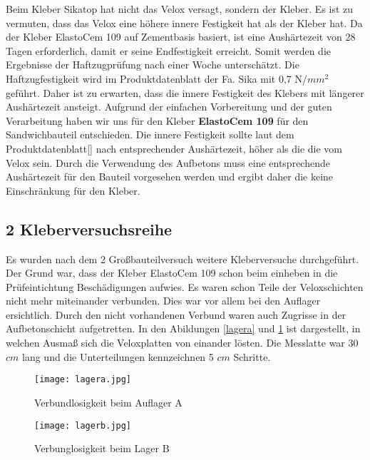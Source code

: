 \documentclass[12 pt,a4 paper ]{scrreprt}
\begin{document}
Beim Kleber Sikatop hat nicht das Velox versagt, sondern der Kleber. Es ist zu vermuten, dass das Velox eine höhere innere Festigkeit hat als der Kleber hat. Da der Kleber ElastoCem 109 auf Zementbasis basiert, ist eine Aushärtezeit von 28 Tagen erforderlich, damit er seine Endfestigkeit erreicht.  Somit werden die Ergebnisse der Haftzugprüfung nach einer Woche unterschätzt.  Die Haftzugfestigkeit wird im Produktdatenblatt der Fa. Sika mit 0,7 N/$mm^{2}$ geführt. Daher ist zu erwarten, dass die innere Festigkeit des Klebers mit längerer Aushärtezeit ansteigt.
Aufgrund der einfachen Vorbereitung und der guten Verarbeitung haben wir uns für den Kleber \textbf{ElastoCem 109} für den Sandwichbauteil entschieden. Die innere Festigkeit sollte laut dem Produktdatenblatt[] nach entsprechender Aushärtezeit, höher als die die vom Velox sein. Durch die Verwendung des Aufbetons muss eine entsprechende Aushärtezeit für den Bauteil vorgesehen werden und ergibt daher die keine Einschränkung für den Kleber. 



\subsection{2 Kleberversuchsreihe}

Es wurden nach dem 2 Großbauteilversuch weitere Kleberversuche durchgeführt. Der Grund war, dass der Kleber ElastoCem 109 schon beim einheben in die Prüfeintichtung Beschädigungen aufwies. Es waren schon Teile der Veloxschichten nicht mehr miteinander verbunden. Dies war vor allem bei den Auflager ersichtlich. Durch den nicht vorhandenen Verbund waren auch Zugrisse in der Aufbetonschicht aufgetretten. In den Abildungen \ref{lagera} und \ref{lagerb} ist dargestellt, in welchen Ausmaß sich die Veloxplatten von einander lösten. Die Messlatte war 30 $ cm $ lang und die Unterteilungen kennzeichnen 5 $ cm $ Schritte.  

\begin{figure} [h]
\begin{minipage}[hbt]{7cm}	
	\texttt{[image: lagera.jpg]}
	\caption{Verbundlosigkeit beim Auflager A}
	\label{lagera}
\end{minipage}
\hfill
\begin{minipage}[hbt]{7cm}
	\texttt{[image: lagerb.jpg]}
	\caption{Verbunglosigkeit beim Lager B}
	\label{lagerb}
\end{minipage}
\end{figure}
\end{document}
